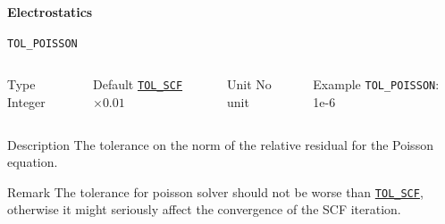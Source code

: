 

\begin{frame}[allowframebreaks,c]{} \label{Electrostatics}

\begin{center}
\Huge \textbf{Electrostatics}
\end{center}

\end{frame}




\begin{frame}[allowframebreaks]{\texttt{TOL\_POISSON}} \label{TOL_POISSON}
\vspace*{-12pt}
\begin{columns}
\begin{block}{Type}
Integer
\end{block}

\begin{block}{Default}
\hyperlink{TOL_SCF}{\texttt{TOL\_SCF}}$\times 0.01$
\end{block}

\begin{block}{Unit}
No unit
\end{block}

\begin{block}{Example}
\texttt{TOL\_POISSON}: 1e-6
\end{block}
\end{columns}

\begin{block}{Description}
The tolerance on the norm of the relative residual for the Poisson equation.
\end{block}

\begin{block}{Remark}
The tolerance for poisson solver should not be worse than \hyperlink{TOL_SCF}{\texttt{TOL\_SCF}}, otherwise it might seriously affect  the convergence of the SCF iteration.
\end{block}

\end{frame}


